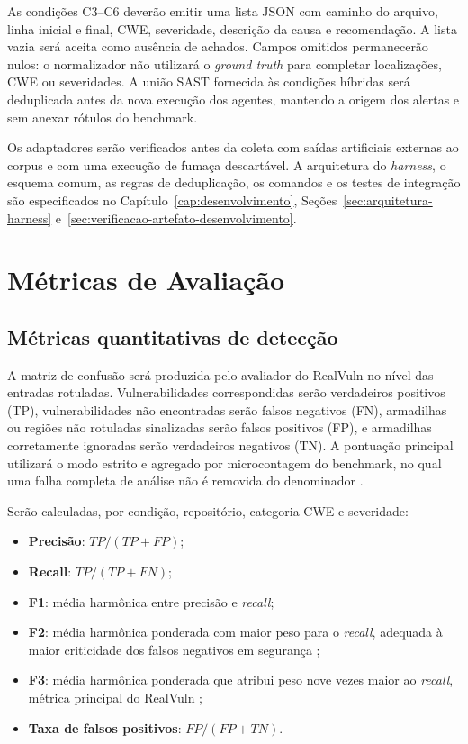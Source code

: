 As condições C3--C6 deverão emitir uma lista JSON com caminho do arquivo, linha inicial e final, CWE, severidade, descrição da causa e recomendação. A lista vazia será aceita como ausência de achados. Campos omitidos permanecerão nulos: o normalizador não utilizará o \textit{ground truth} para completar localizações, CWE ou severidades. A união SAST fornecida às condições híbridas será deduplicada antes da nova execução dos agentes, mantendo a origem dos alertas e sem anexar rótulos do benchmark.

Os adaptadores serão verificados antes da coleta com saídas artificiais externas ao corpus e com uma execução de fumaça descartável. A arquitetura do \textit{harness}, o esquema comum, as regras de deduplicação, os comandos e os testes de integração são especificados no Capítulo~\ref{cap:desenvolvimento}, Seções~\ref{sec:arquitetura-harness} e~\ref{sec:verificacao-artefato-desenvolvimento}.

\section{Métricas de Avaliação}\label{sec:metricas-metodologia}

\subsection{Métricas quantitativas de detecção}\label{subsec:metricas-quantitativas-metodologia}

A matriz de confusão será produzida pelo avaliador do RealVuln no nível das entradas rotuladas. Vulnerabilidades correspondidas serão verdadeiros positivos (TP), vulnerabilidades não encontradas serão falsos negativos (FN), armadilhas ou regiões não rotuladas sinalizadas serão falsos positivos (FP), e armadilhas corretamente ignoradas serão verdadeiros negativos (TN). A pontuação principal utilizará o modo estrito e agregado por microcontagem do benchmark, no qual uma falha completa de análise não é removida do denominador \cite{Pellew2026RealVuln}.

Serão calculadas, por condição, repositório, categoria CWE e severidade:

\begin{itemize}
\item \textbf{Precisão}: $TP/(TP+FP)$;
\item \textbf{Recall}: $TP/(TP+FN)$;
\item \textbf{F1}: média harmônica entre precisão e \textit{recall};
\item \textbf{F2}: média harmônica ponderada com maior peso para o \textit{recall}, adequada à maior criticidade dos falsos negativos em segurança \cite{Kalouptsoglou2023VulnPrediction};
\item \textbf{F3}: média harmônica ponderada que atribui peso nove vezes maior ao \textit{recall}, métrica principal do RealVuln \cite{Pellew2026RealVuln};
\item \textbf{Taxa de falsos positivos}: $FP/(FP+TN)$.
\end{itemize}


